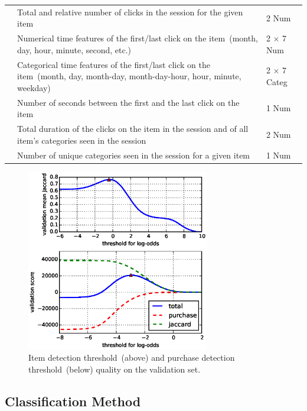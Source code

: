 \documentclass{sig-alternate}
\begin{document}
\begin{table}
\begin{tabular}{|m{2cm}|p{12cm}|m{2.5cm}|}
        & Total and relative number of clicks in the session for the given item & 2 Num \\ \cline{2-3}
        & Numerical time features of the first/last click on the item~(month, day, hour, minute, second, etc.)
            & 2 $\times$ 7 Num \\ \cline{2-3}
        & Categorical time features of the first/last click on the item~(month, day, month-day, month-day-hour, hour, minute, weekday)
            & 2 $\times$ 7 Categ \\ \cline{2-3}
        & Number of seconds between the first and the last click on the item & 1 Num \\ \cline{2-3}
        & Total duration of the clicks on the item in the session and of all item's categories seen in the session & 2 Num \\ \cline{2-3}
        & Number of unique categories seen in the session for a given item & 1 Num \\
        \hline
    \end{tabular}
\end{table}

\begin{figure}
    \caption{Item detection threshold~(above) and purchase detection threshold~(below) quality on the validation set.}
    \label{fig:thresh}
    \includegraphics[width=8cm]{images/thresholds}
\end{figure}

\subsection{Classification Method}
\label{sec:classification}
\end{document}
